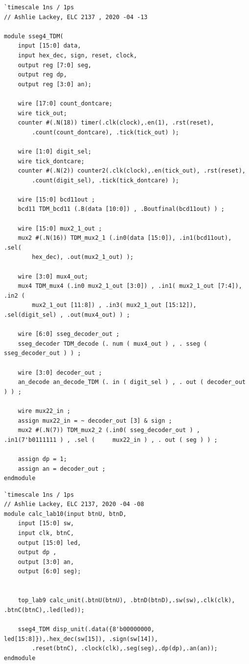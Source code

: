 \documentclass[11pt]{article}
\begin{document}
\begin{lstlisting}[style=Verilog,caption= sseg4\_TDM Verilog Code,label=code:ex ]
`timescale 1ns / 1ps
// Ashlie Lackey, ELC 2137 , 2020 -04 -13

module sseg4_TDM(
	input [15:0] data,
	input hex_dec, sign, reset, clock,
	output reg [7:0] seg,
	output reg dp,
	output reg [3:0] an);
	
	wire [17:0] count_dontcare; 
	wire tick_out;
	counter #(.N(18)) timer(.clk(clock),.en(1), .rst(reset), 
		.count(count_dontcare), .tick(tick_out) );
	
	wire [1:0] digit_sel;
	wire tick_dontcare;
	counter #(.N(2)) counter2(.clk(clock),.en(tick_out), .rst(reset),
		.count(digit_sel), .tick(tick_dontcare) );
	
	wire [15:0] bcd11out ;
	bcd11 TDM_bcd11 (.B(data [10:0]) , .Boutfinal(bcd11out) ) ;
	
	wire [15:0] mux2_1_out ;
	mux2 #(.N(16)) TDM_mux2_1 (.in0(data [15:0]), .in1(bcd11out), .sel(
		hex_dec), .out(mux2_1_out) );
	
	wire [3:0] mux4_out;
	mux4 TDM_mux4 (.in0 mux2_1_out [3:0]) , .in1( mux2_1_out [7:4]), .in2 (
		mux2_1_out [11:8]) , .in3( mux2_1_out [15:12]), .sel(digit_sel) , .out(mux4_out) ) ;
	
	wire [6:0] sseg_decoder_out ;
	sseg_decoder TDM_decode (. num ( mux4_out ) , . sseg ( sseg_decoder_out ) ) ;
	
	wire [3:0] decoder_out ;
	an_decode an_decode_TDM (. in ( digit_sel ) , . out ( decoder_out ) ) ;
	
	wire mux22_in ;
	assign mux22_in = ~ decoder_out [3] & sign ;
	mux2 #(.N(7)) TDM_mux2_2 (.in0( sseg_decoder_out ) , .in1(7'b0111111 ) , .sel ( 	mux22_in ) , . out ( seg ) ) ;
	
	assign dp = 1;
	assign an = decoder_out ;
endmodule
\end{lstlisting}

\begin{lstlisting}[style=Verilog,caption= calc\_lab10 Verilog Code ,label=code:ex ]
`timescale 1ns / 1ps
// Ashlie Lackey, ELC 2137, 2020 -04 -08
module calc_lab10(input btnU, btnD,
	input [15:0] sw,
	input clk, btnC,
	output [15:0] led,
	output dp ,
	output [3:0] an,
	output [6:0] seg);
	
	
	top_lab9 calc_unit(.btnU(btnU), .btnD(btnD),.sw(sw),.clk(clk), .btnC(btnC),.led(led));
	
	sseg4_TDM disp_unit(.data({8'b00000000, led[15:8]}),.hex_dec(sw[15]), .sign(sw[14]),
		.reset(btnC), .clock(clk),.seg(seg),.dp(dp),.an(an));
endmodule
\end{lstlisting}
\end{document}
